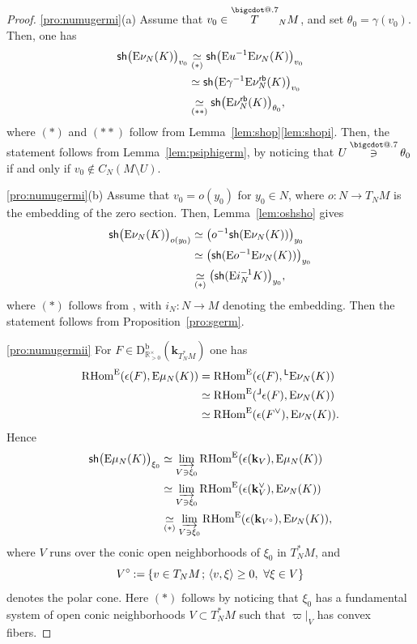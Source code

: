 \documentclass[11pt]{article}
\makeatletter
\newcommand{\skpt}{\smallskip}
\numberwithin{equation}{section}
\newcommand{\accentset}[2]{\overset{#1}{#2}}
\newcommand*\bigcdot{\mathpalette\bigcdot@{.7}}
\newcommand*\bigcdot@[2]{\mathbin{\vcenter{\hbox{\scalebox{#2}{$\m@th#1\bullet$}}}}}
\newcommand{\bdot}[1]{{\accentset{\bigcdot}{#1}}\vphantom{#1}}
\newcommand{\dotowns}{\mathbin{\bdot\owns}}
\newcommand{\semicolon}{\nobreak \mskip2mu\mathpunct{}\nonscript\mkern-\thinmuskip{;}\mskip6mu plus1mu\relax}
\newcommand{\bl}{\bigl(}
\newcommand{\br}{\bigr)}
\theoremstyle{plain}
\theoremstyle{definition}
\newcommand{\R}{\mathbb{R}}
\newcommand{\derived}[1]{\mathrm{#1}}
\newcommand{\derd}{\derived{D}}
\newcommand{\derr}{\derived{R}}
\newcommand{\BDC}{\derd^{\mathrm{b}}}
\newcommand{\RHom}[1][]{\derr\mathrm{Hom}_{\raise1.5ex\hbox to.1em{}#1}}
\newcommand{\FHom}{\RHom^\enh}
\newcommand{\Eopb}[1]{\enh#1^{-1}}
\newcommand{\Emu}{\enh\mu}
\newcommand{\Enu}{\enh\nu}
\newcommand{\field}{\mathbf{k}}\let\cor\field
\newcommand{\rb}{\mathsf{rb}}
\newcommand{\sh}{\mathsf{sh}}
\newcommand{\Gmp}{\R^\times_{>0}}
\newcommand{\Lap}{\mathsf{L}}
\newcommand{\lap}{{}^\Lap}
\newcommand{\Lapatemp}[2]{\reflectbox{$#1\Lap$}}
\newcommand{\Lapa}{{\mathpalette\Lapatemp\relax}}
\newcommand{\lapa}{{}^{\Lapa}}
\newcommand{\defeq}{\mathbin{:=}}\let \seteq\defeq
\newcommand{\ilim}[1][]{\mathop{\varinjlim}\limits_{#1}}
\newcommand{\opb}[1]{#1^{-1}}
\makeatother
\begin{document}
\skpt
\begin{proof}
\eqref{pro:numugermi}(a) Assume that $v_0\in\bdot T_NM$, and set $\theta_0=\gamma(v_0)$. Then, one has
\begin{align*}
\sh\bl\Enu_N(K)\br_{v_0}
&\underset{(*)}\simeq \sh\bl\Eopb u\Enu_N(K)\br_{v_0} \\
&\simeq \sh\bl\Eopb \gamma\Enu^\rb_N(K)\br_{v_0} \\
&\underset{(**)}\simeq \sh\bl\Enu^\rb_N(K)\br_{\theta_0},
\end{align*}
where $(*)$ and $(**)$ follow from Lemma~\ref{lem:shop}\eqref{lem:shopi}.
Then, the statement follows from Lemma~\ref{lem:psiphigerm}, by noticing
that $U\dotowns \theta_0$ if and only if $v_0\notin C_N(M\setminus U)$.

\eqref{pro:numugermi}(b)
Assume that $v_0=o(y_0)$ for $y_0\in N$, where $o\colon N\to T_NM$ is the embedding of the zero section. Then, Lemma~\ref{lem:oshsho} gives
\begin{align*}
\sh\bl\Enu_N(K)\br_{o(y_0)}
&\simeq \bl\opb o \sh(\Enu_N(K))\br_{y_0} \\
&\simeq \bl \sh(\Eopb o\Enu_N(K))\br_{y_0} \\
&\underset{(*)}\simeq \bl \sh(\Eopb {i_N}K)\br_{y_0},
\end{align*}
where $(*)$ follows from \cite[Lem.\,4.8(i)]{DK19nu}, with $i_N\colon N\to M$ denoting the embedding.
Then the statement follows from Proposition~\ref{pro:sgerm}.

\eqref{pro:numugermii}
For $F\in\BDC_{\Gmp}(\field_{T^*_NM})$ one has
\begin{align*}
\FHom(\epsilon(F),\Emu_N(K))
&= \FHom(\epsilon(F),\lap\Enu_N(K)) \\
&\simeq \FHom(\lapa \epsilon(F),\Enu_N(K)) \\
&\simeq \FHom(\epsilon(F^\vee),\Enu_N(K)).
\end{align*}
Hence
\begin{align*}
\sh\bl\Emu_N(K)\br_{\xi_0}
&\simeq \ilim[V\owns\xi_0] \FHom(\epsilon(\field_V),\Emu_N(K)) \\
&\simeq \ilim[V\owns\xi_0] \FHom(\epsilon(\field_V^\vee),\Enu_N(K)) \\
&\underset{(*)}\simeq \ilim[V\owns\xi_0] \FHom(\epsilon(\field_{V^\circ}),\Enu_N(K)) ,
\end{align*}
where $V$ runs over the conic open neighborhoods of $\xi_0$ in $T^*_NM$,
and
\[
V^\circ \defeq \{v\in T_NM \semicolon \langle v,\xi \rangle \geq 0, \ \forall
\xi\in V \}
\]
denotes the polar cone.
Here $(*)$ follows by noticing that
$\xi_0$ has a fundamental system of open conic neighborhoods $V\subset T^*_NM$ such that $\varpi|_V$ has convex fibers.


\end{proof}
\end{document}
